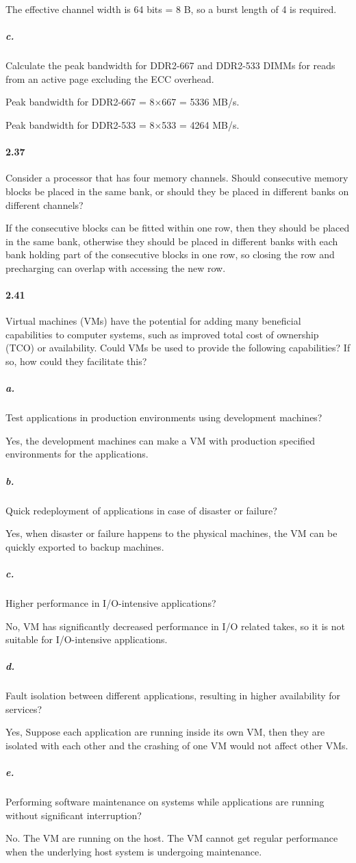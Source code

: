 \documentclass{article}
\begin{document}
The effective channel width is 64 bits = 8 B, so a burst length of 4 is required.

\subparagraph{c.} Calculate the peak bandwidth for DDR2-667 and DDR2-533 DIMMs for reads from an active page excluding the ECC overhead.

Peak bandwidth for DDR2-667 = 8$\times$667 = 5336 MB/s.

Peak bandwidth for DDR2-533 = 8$\times$533 = 4264 MB/s.

\paragraph{2.37} Consider a processor that has four memory channels. Should consecutive memory blocks be placed in the same bank, or should they be placed in different banks on different channels?

If the consecutive blocks can be fitted within one row, then they should be placed in the same bank, otherwise they should be placed in different banks with each bank holding part of the consecutive blocks in one row, so closing the row and precharging can overlap with accessing the new row.

\paragraph{2.41} Virtual machines (VMs) have the potential for adding many beneficial capabilities to computer systems, such as improved total cost of ownership (TCO) or availability. Could VMs be used to provide the following capabilities? If so, how could they facilitate this?

\subparagraph{a.} Test applications in production environments using development machines?

Yes, the development machines can make a VM with production specified environments for the applications.

\subparagraph{b.} Quick redeployment of applications in case of disaster or failure?

Yes, when disaster or failure happens to the physical machines, the VM can be quickly exported to backup machines.

\subparagraph{c.} Higher performance in I/O-intensive applications?

No, VM has significantly decreased performance in I/O related takes, so it is not suitable for I/O-intensive applications.

\subparagraph{d.} Fault isolation between different applications, resulting in higher availability for services?

Yes, Suppose each application are running inside its own VM, then they are isolated with each other and the crashing of one VM would not affect other VMs.

\subparagraph{e.} Performing software maintenance on systems while applications are running without significant interruption?

No. The VM are running on the host. The VM cannot get regular performance when the underlying host system is undergoing maintenance.
\end{document}

